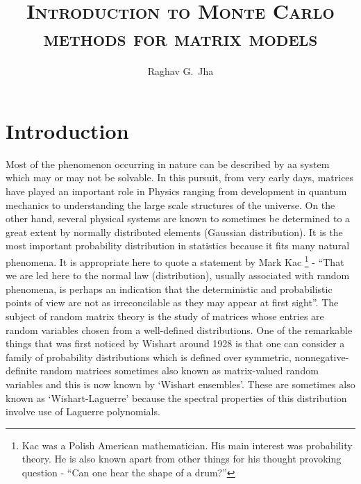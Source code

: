 \documentclass[11pt]{article}
\title{\textsc{Introduction to Monte Carlo methods for matrix models}}
\author[a]{Raghav G.~Jha}
\affiliation{Perimeter Institute for Theoretical Physics, Waterloo, Ontario N2L 2Y5, Canada}
\begin{document}
\date{}
\maketitle

\section{Introduction}


Most of the phenomenon occurring in nature can be described by aa  system which may or may not be solvable. In this pursuit, from very early days, matrices have played an important role in Physics ranging from development in quantum mechanics to understanding the large scale structures of the universe. On the other hand, several physical systems are known to sometimes be determined to a great extent by normally distributed elements (Gaussian distribution). 
It is the most important probability distribution in statistics because it fits many natural phenomena.
It is appropriate here to quote a statement by Mark Kac 
\footnote{Kac was a Polish American mathematician. His main interest was probability theory. 
He is also known apart from other things for his thought provoking question - ``Can one hear 
the shape of a drum?''} - ``That we are led here to the normal law (distribution), usually associated with random phenomena, is perhaps
an indication that the deterministic and probabilistic points of view are not as irreconcilable as they may appear at first sight''.
The subject of random matrix theory is the study of matrices whose entries are random 
variables chosen from a well-defined distributions. One of the remarkable things that 
was first noticed by Wishart around 1928 is that one can consider a family of 
probability distributions which is defined over symmetric, nonnegative-definite 
random matrices sometimes also known as matrix-valued random variables 
and this is now known by `Wishart ensembles'. These are sometimes also known 
as `Wishart-Laguerre' because the spectral properties of this distribution 
involve use of Laguerre polynomials. 
\end{document}
